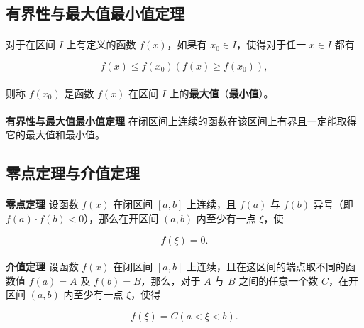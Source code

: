 \subsection{有界性与最大值最小值定理}
\paragraph{}
对于在区间 $I$ 上有定义的函数 $f(x)$，如果有 $x_0 \in I$，使得对于任一 $x \in I$ 都有

\begin{equation}
f(x) \leq f(x_0) (f(x) \geq f(x_0)),
\end{equation}

\paragraph{}
则称 $f(x_0)$ 是函数 $f(x)$ 在区间 $I$ 上的\textbf{最大值}（\textbf{最小值}）。

\paragraph{}
\textbf{有界性与最大值最小值定理\;} 在闭区间上连续的函数在该区间上有界且一定能取得它的最大值和最小值。

\subsection{零点定理与介值定理}
\paragraph{}
\textbf{零点定理\;} 设函数 $f(x)$ 在闭区间 $[a,b]$ 上连续，且 $f(a)$ 与 $f(b)$ 异号（即 $f(a) \cdot f(b) < 0$），那么在开区间 $(a,b)$ 内至少有一点 $\xi$，使

\begin{equation}
f(\xi) = 0.
\end{equation}

\paragraph{}
\textbf{介值定理\;} 设函数 $f(x)$ 在闭区间 $[a,b]$ 上连续，且在这区间的端点取不同的函数值 $f(a) = A$ 及 $f(b) = B$，那么，对于 $A$ 与 $B$ 之间的任意一个数 $C$，在开区间 $(a,b)$ 内至少有一点 $\xi$，使得

\begin{equation}
f(\xi) = C (a < \xi < b).
\end{equation}

